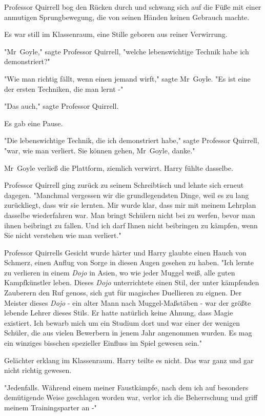 {Professor Quirrell bog den Rücken durch und schwang sich auf die Füße mit einer anmutigen Sprungbewegung, die von seinen Händen keinen Gebrauch machte.

Es war still im Klassenraum, eine Stille geboren aus reiner Verwirrung.

"Mr~Goyle," sagte Professor Quirrell, "welche lebenswichtige Technik habe ich demonstriert?"

"Wie man richtig fällt, wenn einen jemand wirft," sagte Mr~Goyle. "Es ist eine der ersten Techniken, die man lernt -"

"Das auch," sagte Professor Quirrell.

Es gab eine Pause.

"Die lebenswichtige Technik, die ich demonstriert habe," sagte Professor Quirrell, "war, wie man verliert. Sie können gehen, Mr~Goyle, danke."

Mr~Goyle verließ die Plattform, ziemlich verwirrt. Harry fühlte dasselbe.

Professor Quirrell ging zurück zu seinem Schreibtisch und lehnte sich erneut dagegen. "Manchmal vergessen wir die grundlegendsten Dinge, weil es zu lang zurückliegt, dass wir sie lernten. Mir wurde klar, dass mir mit meinem Lehrplan dasselbe wiederfahren war. Man bringt Schülern nicht bei zu werfen, bevor man ihnen beibringt zu fallen. Und ich darf Ihnen nicht beibringen zu kämpfen, wenn Sie nicht verstehen wie man verliert."

Professor Quirrells Gesicht wurde härter und Harry glaubte einen Hauch von Schmerz, einen Anflug von Sorge in diesen Augen gesehen zu haben. "Ich lernte zu verlieren in einem \emph{Dojo} in Asien, wo wie jeder Muggel weiß, alle guten Kampfkünstler leben. Dieses \emph{Dojo} unterrichtete einen Stil, der unter kämpfenden Zauberern den Ruf genoss, sich gut für magisches Duellieren zu eignen. Der Meister dieses \emph{Dojo} - ein alter Mann nach Muggel-Maßstäben - war der größte lebende Lehrer dieses Stils. Er hatte natürlich keine Ahnung, dass Magie existiert. Ich bewarb mich um ein Studium dort und war einer der wenigen Schüler, die aus vielen Bewerbern in jenem Jahr angenommen wurden. Es mag ein winziges bisschen spezieller Einfluss im Spiel gewesen sein."

Gelächter erklang im Klassenraum. Harry teilte es nicht. Das war ganz und gar nicht richtig gewesen.

"Jedenfalls. Während einem meiner Faustkämpfe, nach dem ich auf besonders demütigende Weise geschlagen worden war, verlor ich die Beherrschung und griff meinem Trainingsparter an -"

}
